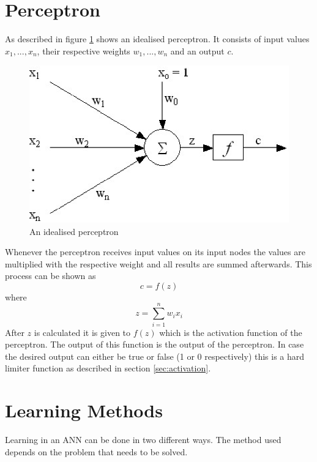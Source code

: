 \section{Perceptron}
\label{sec:perceptron}

As described in \cite[p.178]{pattern} figure \ref{perceptron} shows an idealised perceptron. It consists of input values $x_1,...,x_n$, their respective weights $w_1,...,w_n$ and an output $c$.

\begin{figure}[htbp]
	\begin{center}
		\includegraphics[width=0.55\columnwidth]{graphics/Perceptron}
	\end{center}
	\vspace{-1em}
	\caption{An idealised perceptron}
	\label{perceptron}
\end{figure}

Whenever the perceptron receives input values on its input nodes the values are multiplied with the respective weight and all results are summed afterwards. This process can be shown as \begin{equation} c = f(z) \end{equation} where \begin{equation} z = \sum_{i=1}^n w_ix_i \end{equation} After $z$ is calculated it is given to $f(z)$ which is the activation function of the perceptron. The output of this function is the output of the perceptron. In case the desired output can either be true or false (1 or 0 respectively)  this is a hard limiter function as described in section \ref{sec:activation}.

\section{Learning Methods}

Learning in an ANN can be done in two different ways. The method used depends on the problem that needs to be solved.

